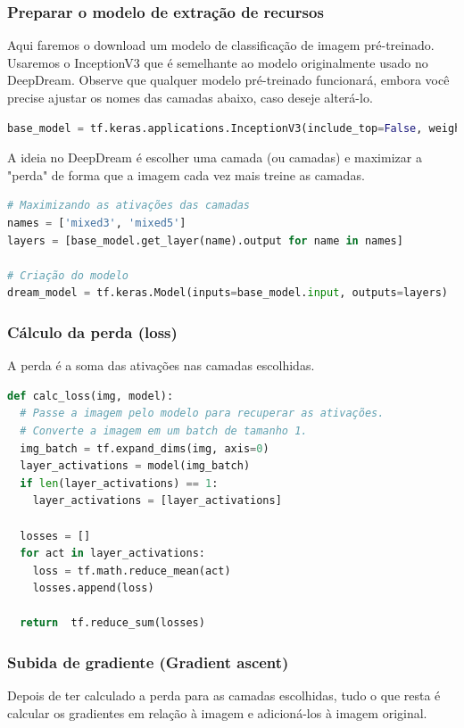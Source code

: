 \subsubsection*{Preparar o modelo de extração de recursos}
Aqui faremos o download um modelo de classificação de imagem pré-treinado. Usaremos o InceptionV3 que é semelhante ao modelo originalmente usado no DeepDream. Observe que qualquer modelo pré-treinado funcionará, embora você precise ajustar os nomes das camadas abaixo, caso deseje alterá-lo.
\begin{lstlisting}[language=Python, style=input]
base_model = tf.keras.applications.InceptionV3(include_top=False, weights='imagenet')
\end{lstlisting}

A ideia no DeepDream é escolher uma camada (ou camadas) e maximizar a "perda" de forma que a imagem cada vez mais treine as camadas.

\begin{lstlisting}[language=Python, style=input]
# Maximizando as ativações das camadas
names = ['mixed3', 'mixed5']
layers = [base_model.get_layer(name).output for name in names]

# Criação do modelo
dream_model = tf.keras.Model(inputs=base_model.input, outputs=layers)
\end{lstlisting}
\subsubsection*{Cálculo da perda (loss)}
A perda é a soma das ativações nas camadas escolhidas.

\begin{lstlisting}[language=Python, style=input]
def calc_loss(img, model):
  # Passe a imagem pelo modelo para recuperar as ativações.
  # Converte a imagem em um batch de tamanho 1.
  img_batch = tf.expand_dims(img, axis=0)
  layer_activations = model(img_batch)
  if len(layer_activations) == 1:
    layer_activations = [layer_activations]

  losses = []
  for act in layer_activations:
    loss = tf.math.reduce_mean(act)
    losses.append(loss)

  return  tf.reduce_sum(losses)
\end{lstlisting}

\subsubsection*{Subida de gradiente (Gradient ascent)}
Depois de ter calculado a perda para as camadas escolhidas, tudo o que resta é calcular os gradientes em relação à imagem e adicioná-los à imagem original.

